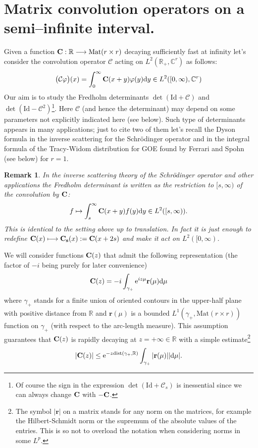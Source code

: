 \documentclass{article}
\newtheorem{remark}{Remark}[section]
\def\r{ {\mathbf r}}
\def \C{{\mathbf C}}
\def\br{\begin{remark}}
\def\er{\end{remark}}
\def\C{{\mathbb C}}
\def\R{{\mathbb R}}
\def\d{{\rm d}}
\def\Id{\mathrm{Id}}
\def\Mat{\mathrm{Mat}}
\newcommand{\be}{\begin{eqnarray}}
\newcommand{\ee}{\end{eqnarray}}
\begin{document}
\section{Matrix convolution operators on a semi--infinite interval.}\label{convolution}
%
%
Given a function ${\bf C}:\R\longrightarrow \Mat(r \times r)$ decaying sufficiently fast at infinity let's consider the convolution operator ${\mathcal C}$ acting on  $L^2(\R_+,\C^r)$ as follows:
\be
\big(\mathcal C\varphi\big)(x) = \int_0^\infty {\bf C}(x+y) \varphi(y)\d y\in L^2([0,\infty), \C^r)
\ee
Our aim is to study the Fredholm determinants $\det(\Id+
\mathcal C)$ and $\det(\Id-\mathcal C^2)$\footnote{Of course the sign in the expression $\det(\Id + \mathcal C_s)$ is inessential since we can always change ${\bf C}$ with $-{\bf C}$.}. Here $\mathcal C$ (and hence the determinant)  may depend on some parameters not explicitly indicated here (see below). Such type of determinants appears in many applications; just to cite two of them let's recall the Dyson formula  \cite{DysonFormula} in the inverse scattering for the Schr\"odinger operator and in the integral formula of the Tracy-Widom distribution for GOE found by Ferrari and Spohn \cite{FSGOE} (see below) for $r=1$. 
\br
In the inverse scattering theory of the Schr\"odinger operator and other applications the Fredholm determinant is written as the restriction to $[s,\infty)$ of the convolution by ${\bf C}$:
\be
f\mapsto \int_s^\infty {\bf C}(x+y)f(y)\d y \in L^2([s,\infty)).
\ee
 This is identical to the setting above up to translation. In fact it is just enough to redefine ${\bf C}(x)\longmapsto {\bf C_s}(x):={\bf C}(x+2s)$ and make it act on $L^2([0,\infty)$.
\er
We will consider functions ${\bf C}(z)$ that admit the following representation (the factor of $-i$  being purely for later convenience)
\be
{\bf C}(z) = -i \int_{\gamma_+} {\rm e}^{i z\mu } \r(\mu) \d \mu
\label{2.3}\ee
where $\gamma_+$ stands for a finite  union of   oriented contours in the upper-half plane with positive distance from $\R$ and $\r(\mu)$ is a bounded  $L^{1}(\gamma_+, \Mat(r\times r))$ function on $\gamma_+$ (with respect to the arc-length measure).
This assumption guarantees that ${\bf C}(z)$ is rapidly decaying at $z=+\infty\in \R$ with a simple estimate\footnote{The symbol $|\r |$ on a matrix stands for any norm on the matrices, for example the Hilbert-Schmidt norm or the supremum of the absolute values of the entries. This is so not to overload the notation when considering norms in some $L^p$.}
\be
|{\bf C}(z)| \leq {\rm e}^{-z {\rm dist} (\gamma_+,\R)} \int_{\gamma_+} |\r(\mu)| |\d\mu|.
\ee
\end{document}
